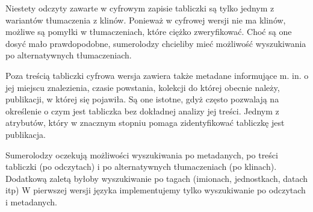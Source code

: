 Niestety odczyty zawarte w cyfrowym zapisie tabliczki są tylko jednym z wariantów tłumaczenia z klinów. 
Ponieważ w cyfrowej wersji nie ma klinów, możliwe są pomyłki w tłumaczeniach, które ciężko zweryfikować.
Choć są one dosyć mało prawdopodobne, sumerolodzy chcieliby mieć możliwość wyszukiwania po alternatywnych tłumaczeniach.


Poza treścią tabliczki cyfrowa wersja zawiera także metadane informujące m. in. o jej miejscu znalezienia, czasie powstania, 
 kolekcji do której obecnie należy, publikacji, w której się pojawiła. 
Są one istotne, gdyż często pozwalają na określenie o czym jest tabliczka bez dokładnej analizy jej treści. 
Jednym z atrybutów, który w znacznym stopniu pomaga zidentyfikować tabliczkę jest publikacja.




Sumerolodzy oczekują możliwości wyszukiwania po metadanych, po treści tabliczki (po odczytach) 
i po alternatywnych tłumaczeniach (po klinach).  %
Dodatkową zaletą byłoby wyszukiwanie po tagach (imionach, jednostkach, datach itp)
W pierwszej wersji języka implementujemy tylko wyszukiwanie po odczytach i metadanych.